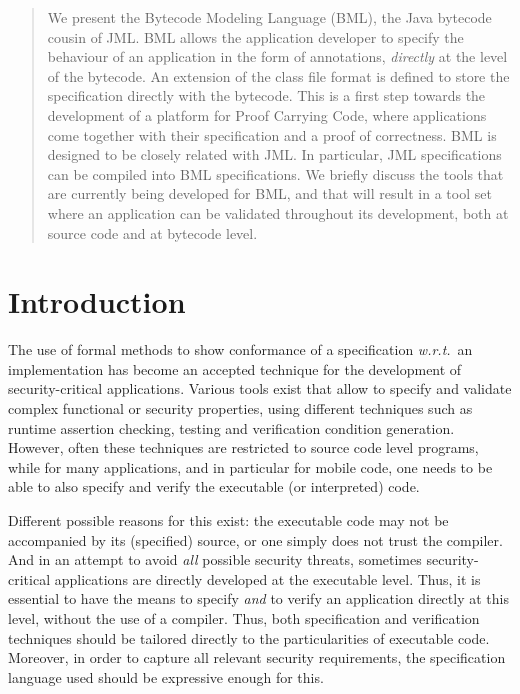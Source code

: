 \begin{abstract} 

We present the Bytecode Modeling Language (BML), the Java bytecode
cousin of JML. BML allows the application developer to specify the
behaviour of an application in the form of annotations,
\emph{directly} at the level of the bytecode. An extension of the class file
format is defined to store the specification directly with the
bytecode. This is a first step towards the development of a platform
for Proof Carrying Code, where applications come together with their
specification and a proof of correctness. BML is designed to be
closely related with JML. In particular, JML specifications can be
compiled into BML specifications. We briefly discuss the tools that
are currently being developed for BML, and that will result in a tool
set where an application can be validated throughout its development,
both at source code and at bytecode level.

\end{abstract}

\section{Introduction}\label{IntroSectLab}

The use of formal methods to show conformance of a specification
\emph{w.r.t.}\ an implementation has become an accepted technique 
for the development of security-critical applications. Various tools
exist that allow to specify and validate complex functional or
security properties, using different techniques such as runtime
assertion checking, testing and verification condition generation.
However, often these techniques are restricted to source code level
programs, while for many applications, and in particular for mobile
code, one needs to be able to also specify and verify the executable
(or interpreted) code.

Different possible reasons for this exist: the executable code may not
be accompanied by its (specified) source, or one simply does not trust
the compiler. And in an attempt to avoid \emph{all} possible security
threats, sometimes security-critical applications are directly
developed at the executable level. Thus, it is essential to have the
means to specify \emph{and} to verify an application directly at this
level, without the use of a compiler. Thus, both specification and
verification techniques should be tailored directly to the
particularities of executable code. Moreover, in order to capture all
relevant security requirements, the specification language used should
be expressive enough for this.

